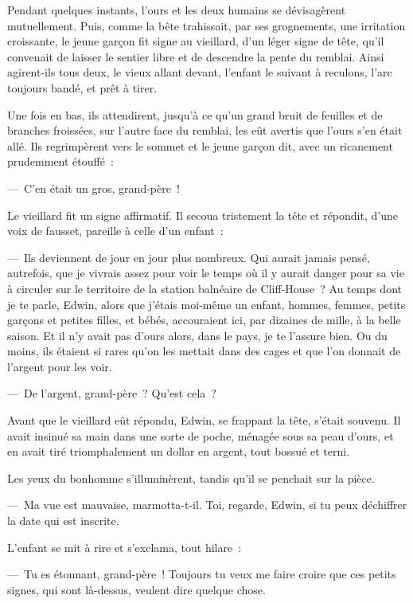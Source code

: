 \documentclass[french,twoside]{book} %
\begin{document}
Pendant quelques instants, l’ours et les deux humains se dévisagèrent mutuellement. Puis, comme la bête trahissait, par ses grognements, une irritation croissante, le jeune garçon fit signe au vieillard, d’un léger signe de tête, qu’il convenait de laisser le sentier libre et de descendre la pente du remblai. Ainsi agirent-ils tous deux, le vieux allant devant, l’enfant le suivant à reculons, l’arc toujours bandé, et prêt à tirer.\par
Une fois en bas, ils attendirent, jusqu’à ce qu’un grand bruit de feuilles et de branches froissées, sur l’autre face du remblai, les eût avertis que l’ours s’en était allé. Ils regrimpèrent vers le sommet et le jeune garçon dit, avec un ricanement prudemment étouffé :\par
— C’en était un gros, grand-père !\par
Le vieillard fit un signe affirmatif. Il secoua tristement la tête et répondit, d’une voix de fausset, pareille à celle d’un enfant :\par
— Ils deviennent de jour en jour plus nombreux. Qui aurait jamais pensé, autrefois, que je vivrais assez pour voir le temps où il y aurait danger pour sa vie à circuler sur le territoire de la station balnéaire de Cliff-House ? Au temps dont je te parle, Edwin, alors que j’étais moi-même un enfant, hommes, femmes, petits garçons et petites filles, et bébés, accouraient ici, par dizaines de mille, à la belle saison. Et il n’y avait pas d’ours alors, dans le pays, je te l’assure bien. Ou du moins, ils étaient si rares qu’on les mettait dans des cages et que l’on donnait de l’argent pour les voir.\par
— De l’argent, grand-père ? Qu’est cela ?\par
Avant que le vieillard eût répondu, Edwin, se frappant la tête, s’était souvenu. Il avait insinué sa main dans une sorte de poche, ménagée sous sa peau d’ours, et en avait tiré triomphalement un dollar en argent, tout bossué et terni.\par
Les yeux du bonhomme s’illuminèrent, tandis qu’il se penchait sur la pièce.\par
— Ma vue est mauvaise, marmotta-t-il. Toi, regarde, Edwin, si tu peux déchiffrer la date qui est inscrite.\par
L’enfant se mit à rire et s’exclama, tout hilare :\par
— Tu es étonnant, grand-père ! Toujours tu veux me faire croire que ces petits signes, qui sont là-dessus, veulent dire quelque chose.\par
\end{document}
